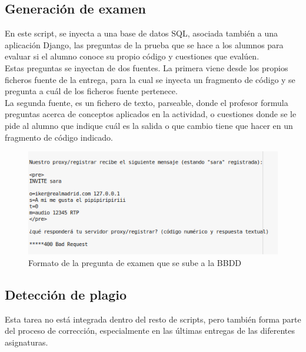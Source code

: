 \subsection{Generación de examen}
\label{sec:gen_exam}

En este script, se inyecta a una base de datos SQL, asociada también a una aplicación Django, las preguntas de la prueba que se hace a los alumnos para evaluar si el alumno conoce su propio código y cuestiones que evalúen.\\


Estas preguntas se inyectan de dos fuentes. La primera viene desde los propios ficheros fuente de la entrega, para la cual se inyecta un fragmento de código y se pregunta a cuál de los ficheros fuente pertenece.\\


La segunda fuente, es un fichero de texto, parseable, donde el profesor formula preguntas acerca de conceptos aplicados en la actividad, o cuestiones donde se le pide al alumno que indique cuál es la salida o que cambio tiene que hacer en un fragmento de código indicado.\\

\begin{figure}[H]
   \centering
   \includegraphics[width=16cm]{img/Selection_020_expregunta}
   \caption{Formato de la pregunta de examen que se sube a la BBDD}
   \label{figura:formato_examen}
\end{figure}

\subsection{Detección de plagio}
\label{sec:detec_plagio}

Esta tarea no está integrada dentro del resto de scripts, pero también forma parte del proceso de corrección, especialmente en las últimas entregas de las diferentes asignaturas.\\


